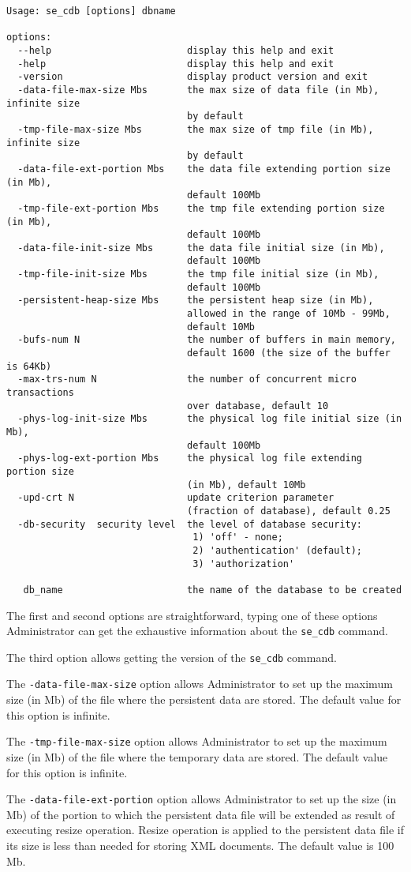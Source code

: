 \documentclass[a4paper,12pt]{article}
\begin{document}
\begin{verbatim}
Usage: se_cdb [options] dbname

options:
  --help		 				display this help and exit
  -help							display this help and exit
  -version						display product version and exit
  -data-file-max-size Mbs		the max size of data file (in Mb), infinite size
								by default
  -tmp-file-max-size Mbs		the max size of tmp file (in Mb), infinite size
								by default
  -data-file-ext-portion Mbs	the data file extending portion size (in Mb), 
								default 100Mb
  -tmp-file-ext-portion Mbs		the tmp file extending portion size (in Mb),
								default 100Mb
  -data-file-init-size Mbs		the data file initial size (in Mb),
								default 100Mb
  -tmp-file-init-size Mbs		the tmp file initial size (in Mb),
								default 100Mb
  -persistent-heap-size Mbs		the persistent heap size (in Mb), 
								allowed in the range of 10Mb - 99Mb,
								default 10Mb
  -bufs-num N					the number of buffers in main memory,
								default 1600 (the size of the buffer is 64Kb)
  -max-trs-num N				the number of concurrent micro transactions
								over database, default 10
  -phys-log-init-size Mbs		the physical log file initial size (in Mb),
								default 100Mb
  -phys-log-ext-portion Mbs		the physical log file extending portion size 
								(in Mb), default 10Mb
  -upd-crt N					update criterion parameter 
								(fraction of database), default 0.25
  -db-security  security level  the level of database security:
								 1) 'off' - none;
								 2) 'authentication' (default);
								 3) 'authorization'
  
   db_name   					the name of the database to be created
\end{verbatim}


The first and second options are straightforward, typing one of these options Administrator can get the exhaustive information about the \verb!se_cdb! command.

The third option allows getting the version of the \verb!se_cdb! command.

The \verb!-data-file-max-size! option allows Administrator to set up the maximum size (in Mb) of the file where the persistent data are stored. The default value for this option is infinite.

The \verb!-tmp-file-max-size! option allows Administrator to set up the maximum size (in Mb) of the file where the temporary data are stored. The default value for this option is infinite.

The \verb!-data-file-ext-portion! option allows Administrator to set up the size (in Mb) of the portion to which the persistent data file will be extended as result of executing resize operation. Resize operation is applied to the persistent data file if its size is less than needed for storing XML documents. The default value is 100 Mb.
\end{document}

